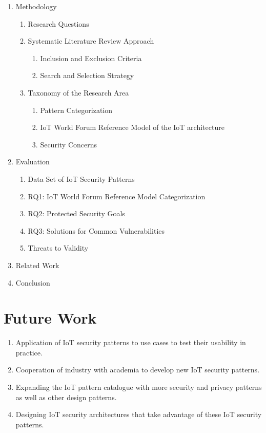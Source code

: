 \documentclass[
    numbers=noenddot,
    parskip=half-,
    fontsize=12pt,
    paper=a4,
    oneside,
    titlepage,
    bibliography=totoc,
    chapterprefix=false,
]{scrbook}
\begin{document}
\begin{enumerate}
		\item Methodology
			\begin{enumerate}
				\item Research Questions
				\item Systematic Literature Review Approach
					\begin{enumerate}
						\item Inclusion and Exclusion Criteria
						\item Search and Selection Strategy
					\end{enumerate}
				\item Taxonomy of the Research Area
					\begin{enumerate}
						\item Pattern Categorization
						\item IoT World Forum Reference Model of the IoT architecture
						\item Security Concerns
					\end{enumerate}
			\end{enumerate}
				
		\item Evaluation
			\begin{enumerate}
				\item Data Set of IoT Security Patterns
				\item RQ1: IoT World Forum Reference Model Categorization
				\item RQ2: Protected Security Goals
				\item RQ3: Solutions for Common Vulnerabilities
				\item Threats to Validity
			\end{enumerate}	
		
		\item Related Work
		
		\item Conclusion
		
	\end{enumerate}



	\chapter{Future Work}
	\label{ch:future_work}
	
	\begin{enumerate}
		\item Application of IoT security patterns to use cases to test their usability in practice.
		\item Cooperation of industry with academia to develop new IoT security patterns.
		\item Expanding the IoT pattern catalogue with more security and privacy patterns as well as other design patterns.
		\item Designing IoT security architectures that take advantage of these IoT security patterns. 
	\end{enumerate}
 

    \backmatter

    \printbibliography
    
\end{document}
